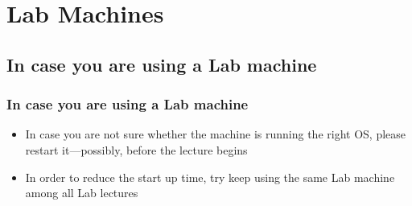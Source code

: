 \documentclass[handout]{beamer}\mode<presentation>{\usetheme{AMSCesenaBleu}}
\begin{document}
\section{Lab Machines}

\subsection{In case you are using a Lab machine}

\begin{frame}
\frametitle{In case you are using a Lab machine}
    
    \begin{itemize}
        \item In case you are not sure whether the machine is running the right OS, please restart it---possibly, before the lecture begins

        \item In order to reduce the start up time, try keep using the same Lab machine among all Lab lectures
    \end{itemize}
    
\end{frame}
\end{document}
